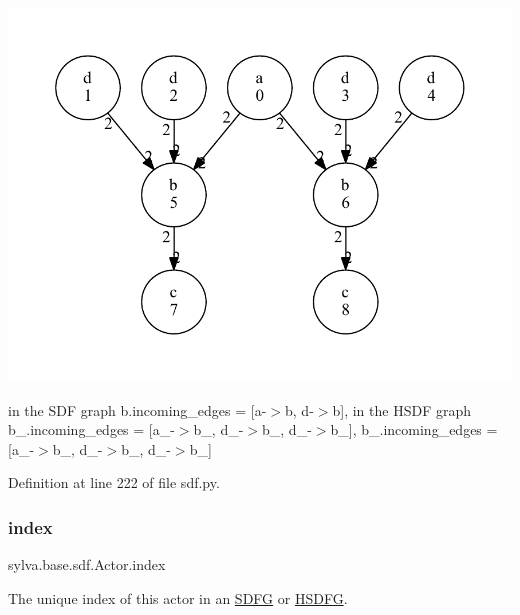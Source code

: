 \begin{DoxyImage}
\includegraphics[width=\textwidth,height=\textheight/2,keepaspectratio=true]{dot_HSDFG_example}
\end{DoxyImage}
 in the S\+DF graph {\ttfamily b.\+incoming\+\_\+edges = \mbox{[}a-\/$>$b, d-\/$>$b\mbox{]}}, in the H\+S\+DF graph {\ttfamily b\+\_.\+incoming\+\_\+edges = \mbox{[}a\+\_-\/$>$b\+\_, d\+\_-\/$>$b\+\_, d\+\_-\/$>$b\+\_\mbox{]}}, {\ttfamily b\+\_.\+incoming\+\_\+edges = \mbox{[}a\+\_-\/$>$b\+\_, d\+\_-\/$>$b\+\_, d\+\_-\/$>$b\+\_\mbox{]}} 

Definition at line 222 of file sdf.\+py.

\mbox{\label{classsylva_1_1base_1_1sdf_1_1_actor_adb41a566fbf747a585a1c961a011a1cf}} 
\subsubsection{\texorpdfstring{index}{index}}
{\footnotesize\ttfamily sylva.\+base.\+sdf.\+Actor.\+index}



The unique index of this actor in an \hyperlink{classsylva_1_1base_1_1sdf_1_1_s_d_f_g}{S\+D\+FG} or \hyperlink{classsylva_1_1base_1_1sdf_1_1_h_s_d_f_g}{H\+S\+D\+FG}. 



